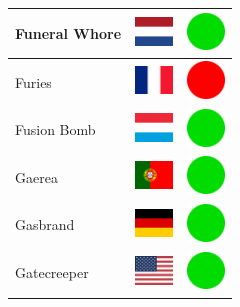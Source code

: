 \documentclass[12pt, a4paper, twoside]{report}
\begin{document}
\begin{center}
\begin{longtable}{|p{5cm}|p{2cm}|p{2cm}|}
 Funeral Whore                                              & \includegraphics[width=1cm]{../4x3/nl} &   \includegraphics[width=1cm]{../likes/y} \\ \hline
 Furies                                                     & \includegraphics[width=1cm]{../4x3/fr} &   \includegraphics[width=1cm]{../likes/n} \\ \hline
 Fusion Bomb                                                & \includegraphics[width=1cm]{../4x3/lu} &   \includegraphics[width=1cm]{../likes/y} \\ \hline
 Gaerea                                                     & \includegraphics[width=1cm]{../4x3/pt} &   \includegraphics[width=1cm]{../likes/y} \\ \hline
 Gasbrand                                                   & \includegraphics[width=1cm]{../4x3/de} &   \includegraphics[width=1cm]{../likes/y} \\ \hline
 Gatecreeper                                                & \includegraphics[width=1cm]{../4x3/us} &   \includegraphics[width=1cm]{../likes/y} \\ \hline

\end{longtable}
\end{center}
\end{document}
